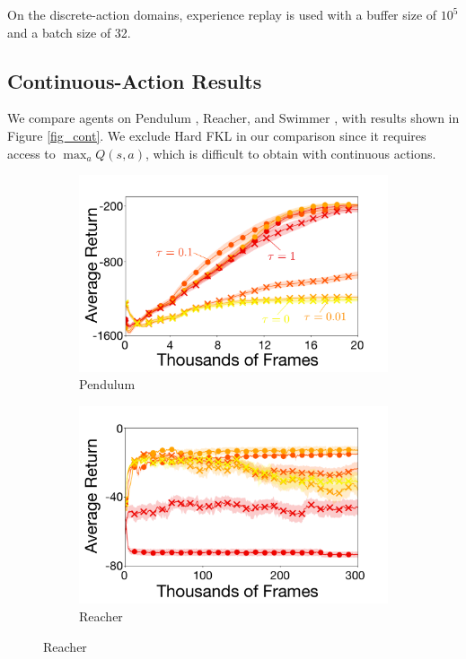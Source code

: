 \documentclass[twoside,11pt]{article}
\begin{document}
On the discrete-action domains, experience replay is used with a buffer size of $10^5$ and a batch size of 32. 

\subsection{Continuous-Action Results}
We compare agents on Pendulum \citep{brockman2016openai}, Reacher, and Swimmer \citep{todorov2012mujoco}, with results shown in Figure \ref{fig_cont}. We exclude Hard FKL in our comparison since it requires access to $\max_a Q(s,a)$, which is difficult to obtain with continuous actions. 


\begin{figure}[t]
  \centering
  \begin{subfigure}[b]{0.5\linewidth}
    \centering
    \includegraphics[width=\columnwidth]{figs/deep/continuous/PD_entropy_comparison.pdf} 
    \caption{Pendulum}\label{fig:pendulum}
  \end{subfigure}%
  \begin{subfigure}[b]{0.5\linewidth}
    \centering
    \includegraphics[width=\columnwidth]{figs/deep/continuous/Reacher_entropy_comparison.pdf} 
    \caption{Reacher}\label{fig:reacher}
  \end{subfigure}
  

\end{figure}
\end{document}
